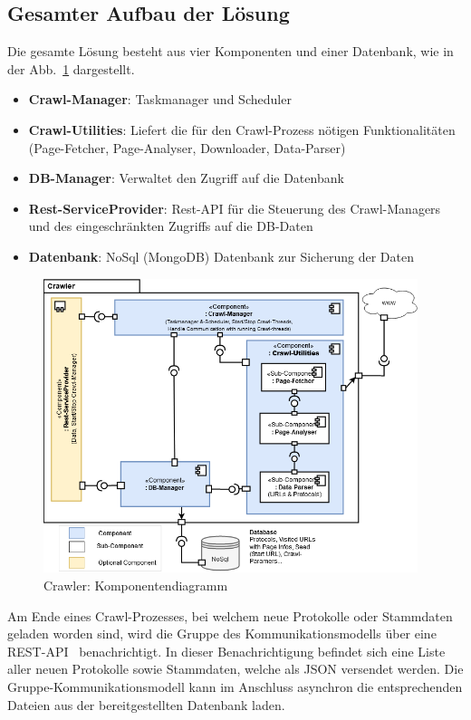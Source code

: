 \subsection{Gesamter Aufbau der Lösung}
Die gesamte Lösung besteht aus vier Komponenten und einer Datenbank, wie in der Abb.~\ref{fig:crawlerKompoenenten} dargestellt. 
\begin{itemize}
    \item \textbf{Crawl-Manager}: Taskmanager und Scheduler
    \item \textbf{Crawl-Utilities}: Liefert die für den Crawl-Prozess nötigen Funktionalitäten (Page-Fetcher, Page-Analyser, Downloader, Data-Parser)
    \item \textbf{DB-Manager}: Verwaltet den Zugriff auf die Datenbank 
    \item \textbf{Rest-ServiceProvider}: Rest-API für die Steuerung des Crawl-Managers und des eingeschränkten Zugriffs auf die DB-Daten
    \item \textbf{Datenbank}: NoSql (MongoDB) Datenbank zur Sicherung der Daten
\end{itemize}

\begin{figure}[H]
    \centering
    \includegraphics[width=4.3in]{images/02-Crawler/Crawler-Component-Diagram.png}
    \caption{Crawler: Komponentendiagramm}
    \label{fig:crawlerKompoenenten}
\end{figure}
\noindent
Am Ende eines Crawl-Prozesses, bei welchem neue Protokolle oder Stammdaten geladen worden sind, wird die Gruppe des Kommunikationsmodells über eine REST-API~\cite{Cme2021} benachrichtigt. In dieser Benachrichtigung befindet sich eine Liste aller neuen Protokolle sowie Stammdaten, welche als JSON versendet werden. Die Gruppe-Kommunikationsmodell kann im Anschluss asynchron die entsprechenden Dateien aus der bereitgestellten Datenbank laden.